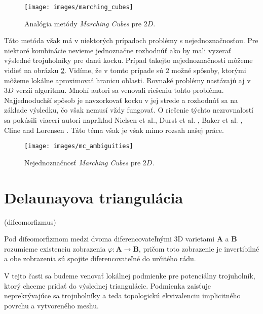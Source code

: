 \begin{figure}
    \centerline{\texttt{[image: images/marching\_cubes]}}
    \caption[Analógia metódy \textit{Marching Cubes}]{Analógia metódy \textit{Marching Cubes} pre $2D$.}
    \label{obr:marching_cubes}
\end{figure}

Táto metóda však má v niektorých prípadoch problémy s nejednoznačnosťou. Pre niektoré kombinácie
nevieme jednoznačne rozhodnúť ako by mali vyzerať výsledné trojuholníky pre danú kocku. Prípad takejto
nejednoznačnosti môžeme vidieť na obrázku \ref{obr:mc_ambiguities}. Vidíme, že v tomto prípade sú $2$ 
možné spôsoby, ktorými môžeme lokálne aproximovať hranicu oblasti. Rovnaké problémy nastávajú aj v $3D$
verzii algoritmu. Mnohí autori sa venovali riešeniu tohto problému. Najjednoduchší spôsob je navzorkovať
kocku v jej strede a rozhodnúť sa na základe výsledku, čo však nemusí vždy fungovať. O riešenie týchto 
nezrovnalostí sa pokúsili viacerí autori napríklad Nielsen et al.\cite{nielson1991asymptotic},
Durst et al. \cite{durst1988re}, Baker et al. \cite{baker1989building},
Cline and Lorensen \cite{cline1988two}. Táto téma však je však mimo rozsah našej práce.

\begin{figure}
    \centerline{\texttt{[image: images/mc\_ambiguities]}}
    \caption[Nejednoznačnosť \textit{Marching Cubes}]{Nejednoznačnosť \textit{Marching Cubes} pre $2D$.}
    \label{obr:mc_ambiguities}
\end{figure}



\section{Delaunayova triangulácia}
\label{kap:delaunay_triangulation}

\begin{note}
    (difeomorfizmus)

    Pod difeomorfizmom medzi dvoma diferencovateľnými 3D varietami $\mathbf{A}$ a $\mathbf{B}$ 
    rozumieme existenciu zobrazenia $\varphi : \mathbf{A} \to \mathbf{B}$, pričom toto zobrazenie 
    je invertibilné a obe zobrazenia sú spojite diferencovateľné do určitého rádu. 
\end{note}

V tejto časti sa budeme venovať lokálnej podmienke pre potenciálny trojuholník, ktorý chceme pridať do 
výslednej triangulácie. Podmienka zaisťuje neprekrývajúce sa trojuholníky a teda topologickú 
ekvivalenciu implicitného povrchu a vytvoreného meshu.

